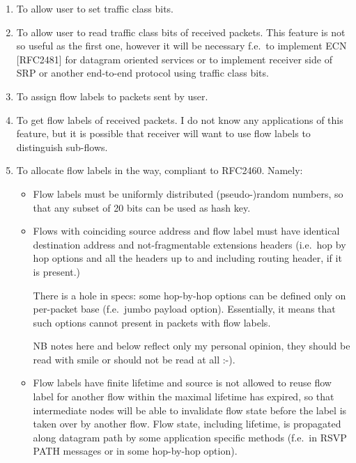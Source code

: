 \begin{enumerate}

\item To allow user to set traffic class bits.

\item To allow user to read traffic class bits of received packets.
This feature is not so useful as the first one, however it will be
necessary f.e.\ to implement ECN [RFC2481] for datagram oriented services
or to implement receiver side of SRP or another end-to-end protocol
using traffic class bits.

\item To assign flow labels to packets sent by user.

\item To get flow labels of received packets. I do not know
any applications of this feature, but it is possible that receiver will
want to use flow labels to distinguish sub-flows.

\item To allocate flow labels in the way, compliant to RFC2460. Namely:

\begin{itemize}
\item
Flow labels must be uniformly distributed (pseudo-)random numbers,
so that any subset of 20 bits can be used as hash key.

\item
Flows with coinciding source address and flow label must have identical
destination address and not-fragmentable extensions headers (i.e.\ 
hop by hop options and all the headers up to and including routing header,
if it is present.)

\begin{NB}
There is a hole in specs: some hop-by-hop options can be
defined only on per-packet base (f.e.\  jumbo payload option).
Essentially, it means that such options cannot present in packets
with flow labels.
\end{NB}
\begin{NB}
NB notes here and below reflect only my personal opinion,
they should be read with smile or should not be read at all :-).
\end{NB}


\item
Flow labels have finite lifetime and source is not allowed to reuse
flow label for another flow within the maximal lifetime has expired,
so that intermediate nodes will be able to invalidate flow state before
the label is taken over by another flow.
Flow state, including lifetime, is propagated along datagram path
by some application specific methods
(f.e.\ in RSVP PATH messages or in some hop-by-hop option).


\end{itemize}

\end{enumerate}

